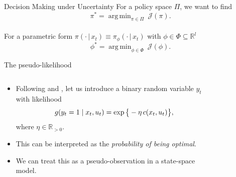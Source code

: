 \documentclass[10pt, aspectratio=1610]{beamer}
\DeclareMathOperator*{\argmin}{arg\,min}
\newcommand{\given}{\,|\,}
\begin{document}
    \begin{frame}{Decision Making under Uncertainty}
        For a policy space $\Pi$, we want to find
        \begin{equation*}
            \pi^{*} = \argmin_{\pi \in \Pi} \medspace \mathcal{J}(\pi).
        \end{equation*}
        ~ \\
        For a parametric form $\pi(\cdot \given x_t) \equiv \pi_{\phi}(\cdot \given x_t)$ with $\phi \in \Phi \subseteq \mathbb{R}^{l}$
        \begin{equation*}
            \phi^{*} = \argmin_{\phi \in \Phi} \medspace \mathcal{J}(\phi).
        \end{equation*}
    \end{frame}

    \begin{frame}{The pseudo-likelihood}
      \begin{columns}
        \begin{column}{0.6\textwidth}
          \begin{itemize}
            \item Following \citet{toussaint2006probabilistic} and \citet{rawlik2013probabilistic}, let us introduce a binary random variable $y_t$ with likelihood
              \begin{equation}
                \smash{g(y_t = 1 \mid x_t, u_t) = \exp \big\{-\eta \, c(x_t, u_t)\big\}},
              \end{equation}
              where $\eta \in \mathbb{R}_{>0}$.
            \item This can be interpreted as the \emph{probability of being optimal}.
            \item We can treat this as a pseudo-observation in a state-space model.
          \end{itemize}
        \end{column}
        \begin{column}{0.4\textwidth}
          \begin{figure}[htbp]
            \label{fig:dgm}
            \centering
            
          \end{figure}
        \end{column}
      \end{columns}
    \end{frame}
\end{document}
